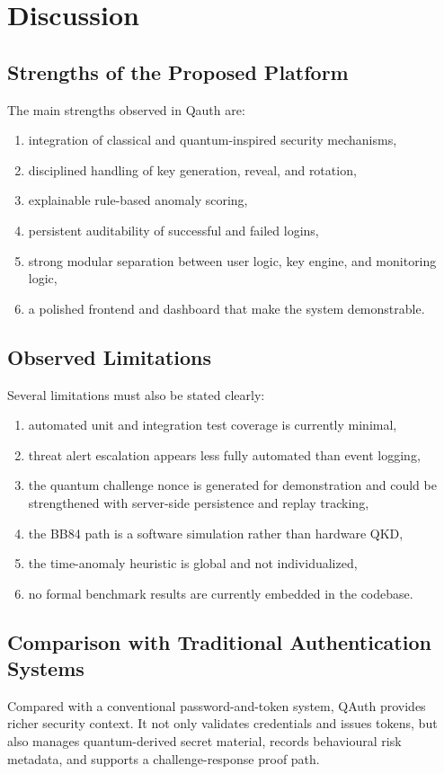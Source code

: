 \documentclass[12pt,a4paper]{report}
\begin{document}
\section{Discussion}

\subsection{Strengths of the Proposed Platform}
The main strengths observed in Qauth are:

\begin{enumerate}
    \item integration of classical and quantum-inspired security mechanisms,
    \item disciplined handling of key generation, reveal, and rotation,
    \item explainable rule-based anomaly scoring,
    \item persistent auditability of successful and failed logins,
    \item strong modular separation between user logic, key engine, and monitoring logic,
    \item a polished frontend and dashboard that make the system demonstrable.
\end{enumerate}

\subsection{Observed Limitations}
Several limitations must also be stated clearly:

\begin{enumerate}
    \item automated unit and integration test coverage is currently minimal,
    \item threat alert escalation appears less fully automated than event logging,
    \item the quantum challenge nonce is generated for demonstration and could be strengthened with server-side persistence and replay tracking,
    \item the BB84 path is a software simulation rather than hardware QKD,
    \item the time-anomaly heuristic is global and not individualized,
    \item no formal benchmark results are currently embedded in the codebase.
\end{enumerate}

\subsection{Comparison with Traditional Authentication Systems}
Compared with a conventional password-and-token system, QAuth provides richer security context. It not only validates credentials and issues tokens, but also manages quantum-derived secret material, records behavioural risk metadata, and supports a challenge-response proof path.
\end{document}
